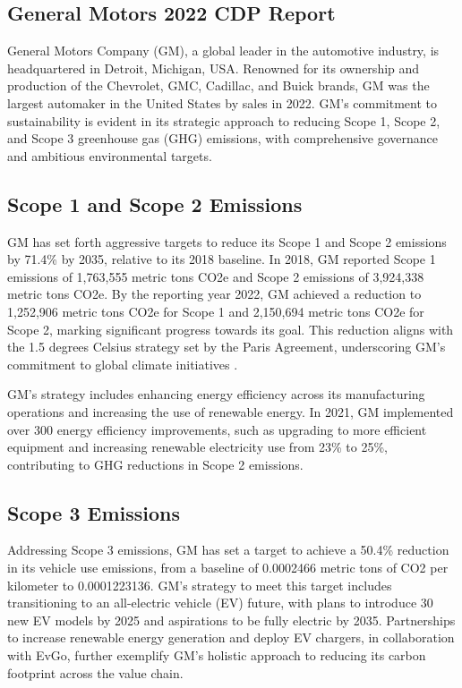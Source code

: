 \subsection{General Motors 2022 CDP Report}
General Motors Company (GM), a global leader in the automotive industry, is headquartered in Detroit, Michigan, USA. Renowned for its ownership and production of the Chevrolet, GMC, Cadillac, and Buick brands, GM was the largest automaker in the United States by sales in 2022. GM's commitment to sustainability is evident in its strategic approach to reducing Scope 1, Scope 2, and Scope 3 greenhouse gas (GHG) emissions, with comprehensive governance and ambitious environmental targets.

\subsection*{Scope 1 and Scope 2 Emissions}
GM has set forth aggressive targets to reduce its Scope 1 and Scope 2 emissions by 71.4\% by 2035, relative to its 2018 baseline. In 2018, GM reported Scope 1 emissions of 1,763,555 metric tons CO2e and Scope 2 emissions of 3,924,338 metric tons CO2e. By the reporting year 2022, GM achieved a reduction to 1,252,906 metric tons CO2e for Scope 1 and 2,150,694 metric tons CO2e for Scope 2, marking significant progress towards its goal. This reduction aligns with the 1.5 degrees Celsius strategy set by the Paris Agreement, underscoring GM's commitment to global climate initiatives \cite{GeneralMotorsWikipedia, Zhou2020Decarbonization}.

GM's strategy includes enhancing energy efficiency across its manufacturing operations and increasing the use of renewable energy. In 2021, GM implemented over 300 energy efficiency improvements, such as upgrading to more efficient equipment and increasing renewable electricity use from 23\% to 25\%, contributing to GHG reductions in Scope 2 emissions.

\subsection*{Scope 3 Emissions}
Addressing Scope 3 emissions, GM has set a target to achieve a 50.4\% reduction in its vehicle use emissions, from a baseline of 0.0002466 metric tons of CO2 per kilometer to 0.0001223136. GM's strategy to meet this target includes transitioning to an all-electric vehicle (EV) future, with plans to introduce 30 new EV models by 2025 and aspirations to be fully electric by 2035. Partnerships to increase renewable energy generation and deploy EV chargers, in collaboration with EvGo, further exemplify GM's holistic approach to reducing its carbon footprint across the value chain.

